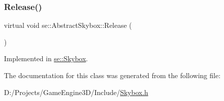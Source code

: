 \subsubsection{\texorpdfstring{Release()}{Release()}}
{\footnotesize\ttfamily virtual void se\+::\+Abstract\+Skybox\+::\+Release (\begin{DoxyParamCaption}{ }\end{DoxyParamCaption})\hspace{0.3cm}{\ttfamily [pure virtual]}}



Implemented in \mbox{\hyperlink{classse_1_1_skybox_ad9a6b80274236240aba6eaafaf7d2e9c}{se\+::\+Skybox}}.



The documentation for this class was generated from the following file\+:\begin{DoxyCompactItemize}
\item 
D\+:/\+Projects/\+Game\+Engine3\+D/\+Include/\mbox{\hyperlink{_skybox_8h}{Skybox.\+h}}\end{DoxyCompactItemize}
